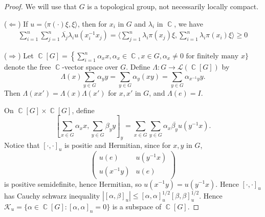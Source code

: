 \documentclass[11pt, a4paper]{memoir}
\DeclareMathOperator{\C}{{\mathbb{C}}}
\newcommand{\impr}{{($\Longrightarrow$)\hspace{0.2cm}}}
\newcommand{\impl}{{($\Longleftarrow$)\hspace{0.2cm}}}
\theoremstyle{change}
\theoremstyle{plain}
\theoremstyle{nonumberplain}
\newtheorem{proof}{Proof}
\numberwithin{equation}{section}
\begin{document}
\begin{proof}
    We will use that $G$ is a topological group, not necessarily locally compact.

    \impl
    If $u=\langle\pi(\cdot)\xi,\xi\rangle$, then for $x_i$ in $G$ and $\lambda_i$ in $\C$, we have
    \begin{align*}
        \sum_{i=1}^n\sum_{j=1}^n\overline{\lambda_j}\lambda_iu(x_i^{-1}x_j)=\langle\sum_{j=1}^n\lambda_i\pi(x_j)\xi,\sum_{i=1}^n\lambda_i\pi(x_i)\xi\rangle\geq 0
    \end{align*}

    \impr
    Let $\C[G]=\left\{\sum_{i=1}^n\alpha_xx,\alpha_x\in\C,x\in G,\alpha_x\neq 0\text{ for finitely many }x\}$ denote the free $\C$-vector space over $G$.
    Define $\Lambda:G\to \mathcal{L}(\C[G])$ by
    \begin{equation*}
        \Lambda(x)\sum_{y\in G}\alpha_yy=\sum_{y\in G}\alpha_y(xy)=\sum_{y\in G}\alpha_{x^{-1}y}y.
    \end{equation*}
    Then $\Lambda(xx')=\Lambda(x)\Lambda(x')$ for $x,x'$ in $G$, and $\Lambda(e)=I$.

    On $\C[G]\times\C[G]$, define
    \begin{equation*}
        \left[\sum_{x\in G}\alpha_xx,\sum_{y\in G}\beta_yy\right]_y = \sum_{x\in G}\sum_{y\in G}\alpha_x\overline{\beta_y}u(y^{-1}x).
    \end{equation*}
    Notice that $[\cdot,\cdot]_u$ is positie and Hermitian, since for $x,y$ in $G$,
    \begin{equation*}
        \begin{pmatrix}
            u(e) & u(y^{-1}x)\\
            u(x^{-1} y) & u(e)
        \end{pmatrix}
    \end{equation*}
    is positive semidefinite, hence Hermitian, so $u(x^{-1}y)=u(y^{-1}x)$.
    Hence $[\cdot,\cdot]_u$ has Cauchy schwarz inequality $|[\alpha,\beta]_u|\leq[\alpha,\alpha]_u^{1/2}[\beta,\beta]_u^{1/2}$.
    Hence $\mathcal{K}_u=\{\alpha\in\C[G]:[\alpha,\alpha]_n=0\}$ is a subspace of $\C[G]$.


\end{proof}
\end{document}
